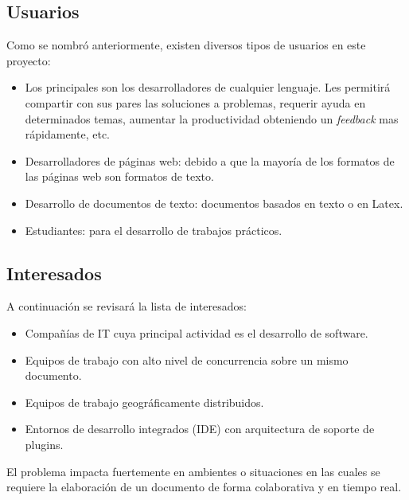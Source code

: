 \documentclass[a4paper,11pt]{article}
\begin{document}
		\subsection{Usuarios}
		    Como se nombr\'o anteriormente, existen diversos tipos de usuarios en este proyecto:

		    \begin{itemize}
				\item 	Los principales son los desarrolladores de cualquier lenguaje. Les permitir\'a
						compartir con sus pares las soluciones a problemas, requerir ayuda en
						determinados temas, aumentar la productividad obteniendo un \textit{feedback} mas
						r\'apidamente, etc.

				\item 	Desarrolladores de p\'aginas web: debido a que la mayor\'ia de los formatos
						de las p\'aginas web son formatos de texto.

				\item	Desarrollo de documentos de texto: documentos basados en texto o en Latex.

				\item	Estudiantes: para el desarrollo de trabajos pr\'acticos.

		    \end{itemize}

		\subsection{Interesados}
		    A continuaci\'on se revisar\'a la lista de interesados:

		    \begin{itemize}
				\item 	Compa\~n\'ias de IT cuya principal actividad es el desarrollo de software.

				\item 	Equipos de trabajo con alto nivel de concurrencia sobre un mismo documento.

				\item 	Equipos de trabajo geogr\'aficamente distribuidos.

				\item	Entornos de desarrollo integrados (IDE) con arquitectura de soporte de plugins.
		    \end{itemize}

		    El problema impacta fuertemente en ambientes o situaciones en las cuales se requiere
		    la elaboraci\'on de un documento de forma colaborativa y en tiempo real.
\end{document}
